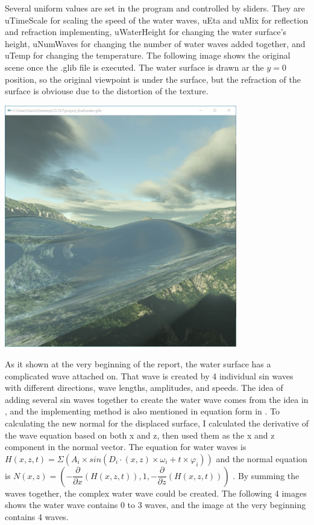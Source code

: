 \documentclass[letterpaper,14pt,titlepage,fleqn]{article}
\begin{document}
Several uniform values are set in the program and controlled by sliders. They are uTimeScale for scaling the speed of the water waves, uEta and uMix for reflection and refraction implementing, uWaterHeight for changing the water surface's height, uNumWaves for changing the number of water waves added together, and uTemp for changing the temperature. The following image shows the original scene once the .glib file is executed. The water surface is drawn ar the $y=0$ position, so the original viewpoint is under the surface, but the refraction of the surface is obviouse due to the distortion of the texture.
\begin{center}
	\includegraphics[width=4in]{origin.jpg}
\end{center}
As it shown at the very beginning of the report, the water surface has a complicated wave attached on. That wave is created by 4 individual sin waves with different directions, wave lengths, amplitudes, and speeds. The idea of adding several sin waves together to create the water wave comes from the idea in \cite{waterSimu}, and the implementing method is also mentioned in equation form in \cite{RealTime}. To calculating the new normal for the displaced surface, I calculated the derivative of the wave equation based on both x and z, then used them as the x and z component in the normal vector. The equation for water waves is $H(x,z,t) = \Sigma (A_i\times sin(D_i\cdot(x,z)\times {\omega}_i+t\times {\varphi}_i))$ and the normal equation is $N(x,z) = (-\dfrac{\partial}{\partial x}(H(x,z,t)),1,-\dfrac{\partial}{\partial z}(H(x,z,t)))$ \cite{RealTime}. By summing the waves together, the complex water wave could be created. The following 4 images shows the water wave contains 0 to 3 waves, and the image at the very beginning contains 4 waves.
\end{document}

